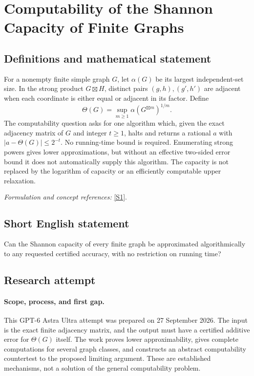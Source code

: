 \documentclass[11pt]{article}
\begin{document}
\section*{\texorpdfstring{Computability of the Shannon Capacity of Finite Graphs}{Computability of the Shannon Capacity of Finite Graphs}}\label{408}
\subsection{Definitions and mathematical statement}
For a nonempty finite simple graph $G$, let $\alpha(G)$ be its largest independent-set size. In the strong product $G\boxtimes H$, distinct pairs $(g,h),(g',h')$ are adjacent when each coordinate is either equal or adjacent in its factor. Define
\[
 \Theta(G)=\sup_{m\ge1}\alpha(G^{\boxtimes m})^{1/m}.
\]
The computability question asks for one algorithm which, given the exact adjacency matrix of $G$ and integer $t\ge1$, halts and returns a rational $a$ with $|a-\Theta(G)|\le2^{-t}$. No running-time bound is required. Enumerating strong powers gives lower approximations, but without an effective two-sided error bound it does not automatically supply this algorithm. The capacity is not replaced by the logarithm of capacity or an efficiently computable upper relaxation.
\par\smallskip\textit{Formulation and concept references:} \href{https://arxiv.org/html/2010.06873v3}{[S1]}.

\subsection{Short English statement}
Can the Shannon capacity of every finite graph be approximated algorithmically to any requested certified accuracy, with no restriction on running time?
\subsection{Research attempt}
\paragraph{Scope, process, and first gap.}
This GPT-6 Astra Ultra attempt was prepared on 27 September 2026. The input is the exact finite adjacency matrix, and the output must have a certified additive error for $\Theta(G)$ itself. The work proves lower approximability, gives complete computations for several graph classes, and constructs an abstract computability countertest to the proposed limiting argument. These are established mechanisms, not a solution of the general computability problem.
\end{document}
